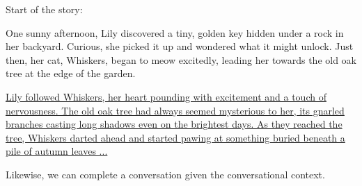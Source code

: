 \vspace{0.5em}
\begin{tcolorbox}

\begingroup
\setlength{\leftskip}{2em}
\setlength{\rightskip}{2em}


\vspace{0.7em}

Start of the story:

One sunny afternoon, Lily discovered a tiny, golden key hidden under a rock in her backyard. Curious, she picked it up and wondered what it might unlock. Just then, her cat, Whiskers, began to meow excitedly, leading her towards the old oak tree at the edge of the garden.

\vspace{0.7em}

\uline{Lily followed Whiskers, her heart pounding with excitement and a touch of nervousness. The old oak tree had always seemed mysterious to her, its gnarled branches casting long shadows even on the brightest days. As they reached the tree, Whiskers darted ahead and started pawing at something buried beneath a pile of autumn leaves ...}

\endgroup

\end{tcolorbox}
\vspace{0.5em}

Likewise, we can complete a conversation given the conversational context.

